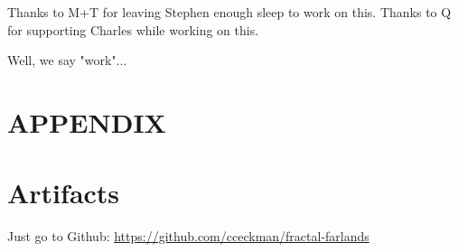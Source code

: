 \documentclass[sigconf,authorversion,nonacm]{acmart}
\begin{document}
    
    
    


\begin{acks}
Thanks to M+T for leaving Stephen enough sleep to work on this. Thanks to Q for supporting Charles while working on this.

Well, we say "work"...
\end{acks}




\appendix
\section*{APPENDIX}
\section{Artifacts}

Just go to Github: \url{https://github.com/cceckman/fractal-farlands}


\end{document}
